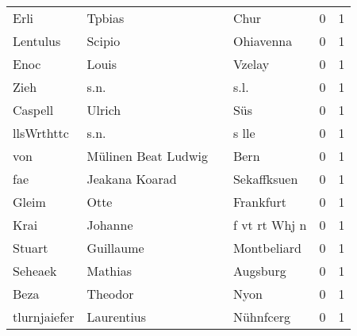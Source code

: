 \documentclass[10pt,a4paper,landscape]{article}
\begin{document}
\begin{longtable}{llllrr}
                     Erli &                             Tpbias &             &                                        Chur &          0 &         1 \\
                 Lentulus &                             Scipio &             &                                   Ohiavenna &          0 &         1 \\
                     Enoc &                              Louis &             &                                      Vzelay &          0 &         1 \\
                     Zieh &                               s.n. &             &                                        s.l. &          0 &         1 \\
                  Caspell &                             Ulrich &             &                                         Süs &          0 &         1 \\
               llsWrthttc &                               s.n. &             &                                       s lle &          0 &         1 \\
                      von &                Mülinen Beat Ludwig &             &                                        Bern &          0 &         1 \\
                      fae &                     Jeakana Koarad &             &                                 Sekaffksuen &          0 &         1 \\
                    Gleim &                               Otte &             &                                   Frankfurt &          0 &         1 \\
                     Krai &                            Johanne &             &                               f vt rt Whj n &          0 &         1 \\
                   Stuart &                          Guillaume &             &                                 Montbeliard &          0 &         1 \\
                  Seheaek &                            Mathias &             &                                    Augsburg &          0 &         1 \\
                     Beza &                            Theodor &             &                                        Nyon &          0 &         1 \\
             tlurnjaiefer &                         Laurentius &             &                                   Nühnfcerg &          0 &         1 \\

\end{longtable}
\end{document}
